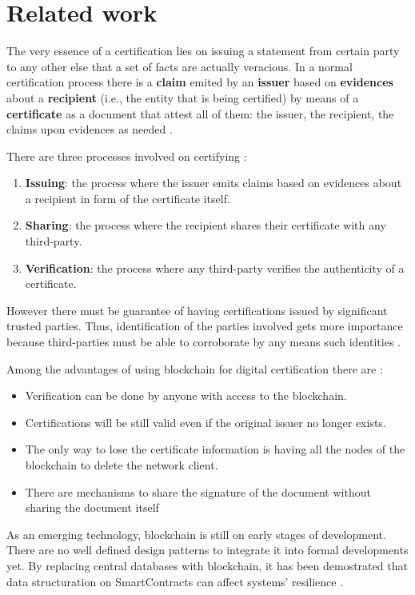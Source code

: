 \documentclass[runningheads]{llncs}
\begin{document}
\section{Related work}

The very essence of a certification lies on issuing a statement from certain party to any other else that a set of facts are actually veracious. In a normal certification process there is a \textbf{claim} emited by an \textbf{issuer} based on \textbf{evidences} about a \textbf{recipient} (i.e., the entity that is being certified) by means of a \textbf{certificate} as a document that attest all of them: the issuer, the recipient, the claims upon evidences as needed \cite{grech2017blockchain}.

There are three processes involved on certifying \cite{grech2017blockchain}:
\begin{enumerate}
	\item \textbf{Issuing}: the process where the issuer emits claims based on evidences about a recipient in form of the certificate itself.
	\item \textbf{Sharing}: the process where the recipient shares their certificate with any third-party.
	\item \textbf{Verification}: the process where any third-party verifies the authenticity of a certificate.
\end{enumerate}

However there must be guarantee of having certifications issued by significant trusted parties. Thus, identification of the parties involved gets more importance because third-parties must be able to corroborate by any means such identities \cite{grech2017blockchain}.

Among the advantages of using blockchain for digital certification there are \cite{grech2017blockchain}:
\begin{itemize}
	\item Verification can be done by anyone with access to the blockchain.
	\item Certifications will be still valid even if the original issuer no longer exists.
	\item The only way to lose the certificate information is having all the nodes of the blockchain to delete the network client.
	\item There are mechanisms to share the signature of the document without sharing the document itself
\end{itemize}

As an emerging technology, blockchain is still on early stages of development. There are no well defined design patterns to integrate it into formal developments yet. By replacing central databases with blockchain, it has been demostrated that data structuration on SmartContracts can affect systems' resilience \cite{Xu2019}.
\end{document}
